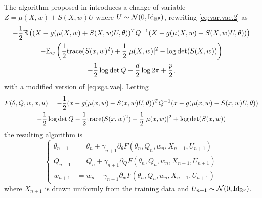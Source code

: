 The algorithm proposed in \citet{kingma2014auto-encoding} introduces a change of variable $Z = \mu(X, w) + S(X,w) U$ where $U\sim\CN(0, \Id[p])$, rewriting \cref{eq:var.vae.2} as
\begin{multline}
\label{eq:var.vae.3}
-\frac{1}{2} \bm{\mathbb E}\left((X-g(\mu(X,w) + S(X,w)U, \theta))^T Q^{-1}(X-g(\mu(X,w) + S(X,w)U, \theta))\right) \\  - \bm{\mathbb E}_w\left(\frac12 {\mathrm{trace}}(S(x,w)^2) + \frac{1}{2} |\mu(X,w)|^2   - \log \det(S(X,w))\right)\\
- \frac12 \log \det Q - \frac{d}2 \log 2\pi + \frac p2,
\end{multline}
with a modified version of \cref{eq:sga.vae}. Letting
\begin{multline*}
F(\theta, Q, w, x, u) = -\frac{1}{2} (x-g(\mu(x,w) - S(x,w)U, \theta))^T Q^{-1}(x-g(\mu(x,w) - S(x,w)U, \theta))\\ - \frac12 \log \det Q  - \frac12 {\mathrm{trace}}(S(x,w)^2) - \frac{1}{2} |\mu(x,w)|^2   +  \log \det(S(x,w))
\end{multline*}
the resulting algorithm is
\begin{equation}
\label{eq:sga.vae.4}
\left\{
\begin{aligned}
\theta_{n+1} &= \theta_n +\gamma_{n+1} \partial_\theta F(\theta_n, Q_n, w_n, X_{n+1},U_{n+1})\\
Q_{n+1} &= Q_n +\gamma_{n+1} \partial_Q F(\theta_n, Q_n, w_n, X_{n+1},U_{n+1})
\\
w_{n+1} &= w_n - \gamma_{n+1} \partial_w F(\theta_n, Q_n, w_n, X_{n+1},U_{n+1})
\end{aligned}
\right.
\end{equation}
where $X_{n+1}$ is drawn uniformly from the training data and 
$U_{n+1} \sim \CN(0, \Id[p])$.

